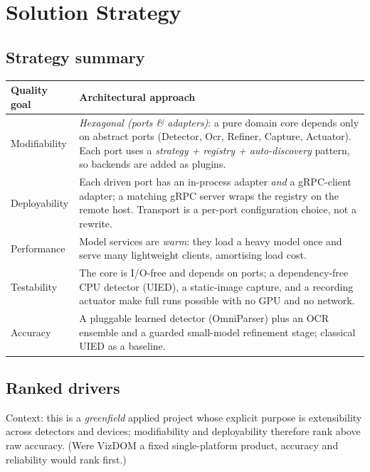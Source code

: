 \documentclass[11pt,a4paper]{report}
\begin{document}
\chapter{Solution Strategy}
\section{Strategy summary}
\begin{longtable}{@{}p{3.4cm}p{11.2cm}@{}}
\toprule
\textbf{Quality goal} & \textbf{Architectural approach} \\
\midrule
\endhead
Modifiability & \emph{Hexagonal (ports \& adapters)}: a pure domain core depends only on abstract ports (Detector, Ocr, Refiner, Capture, Actuator). Each port uses a \emph{strategy + registry + auto-discovery} pattern, so backends are added as plugins. \\
Deployability & Each driven port has an in-process adapter \emph{and} a gRPC-client adapter; a matching gRPC server wraps the registry on the remote host. Transport is a per-port configuration choice, not a rewrite. \\
Performance & Model services are \emph{warm}: they load a heavy model once and serve many lightweight clients, amortising load cost. \\
Testability & The core is I/O-free and depends on ports; a dependency-free CPU detector (UIED), a static-image capture, and a recording actuator make full runs possible with no GPU and no network. \\
Accuracy & A pluggable learned detector (OmniParser) plus an OCR ensemble and a guarded small-model refinement stage; classical UIED as a baseline. \\
\bottomrule
\end{longtable}

\section{Ranked drivers}
Context: this is a \emph{greenfield} applied project whose explicit purpose is
extensibility across detectors and devices; modifiability and deployability
therefore rank above raw accuracy. (Were VizDOM a fixed single-platform product,
accuracy and reliability would rank first.)
\end{document}
